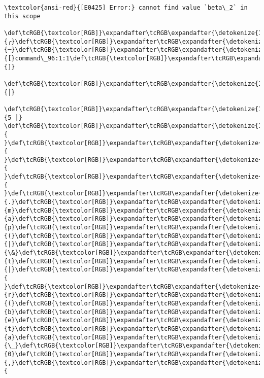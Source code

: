 \documentclass[11pt]{article}
\begin{document}
    \begin{Verbatim}[commandchars=\\\{\}, frame=single, framerule=2mm, rulecolor=\color{outerrorbackground}]
\textcolor{ansi-red}{[E0425] Error:} cannot find value `beta\_2` in this scope
   \def\tcRGB{\textcolor[RGB]}\expandafter\tcRGB\expandafter{\detokenize{148,148,148}}{╭}\def\tcRGB{\textcolor[RGB]}\expandafter\tcRGB\expandafter{\detokenize{148,148,148}}{─}\def\tcRGB{\textcolor[RGB]}\expandafter\tcRGB\expandafter{\detokenize{148,148,148}}{[}command\_96:1:1\def\tcRGB{\textcolor[RGB]}\expandafter\tcRGB\expandafter{\detokenize{148,148,148}}{]}
   \def\tcRGB{\textcolor[RGB]}\expandafter\tcRGB\expandafter{\detokenize{148,148,148}}{│}
 \def\tcRGB{\textcolor[RGB]}\expandafter\tcRGB\expandafter{\detokenize{148,148,148}}{5 │} \def\tcRGB{\textcolor[RGB]}\expandafter\tcRGB\expandafter{\detokenize{178,178,178}}{ }\def\tcRGB{\textcolor[RGB]}\expandafter\tcRGB\expandafter{\detokenize{178,178,178}}{ }\def\tcRGB{\textcolor[RGB]}\expandafter\tcRGB\expandafter{\detokenize{178,178,178}}{ }\def\tcRGB{\textcolor[RGB]}\expandafter\tcRGB\expandafter{\detokenize{178,178,178}}{ }\def\tcRGB{\textcolor[RGB]}\expandafter\tcRGB\expandafter{\detokenize{178,178,178}}{.}\def\tcRGB{\textcolor[RGB]}\expandafter\tcRGB\expandafter{\detokenize{178,178,178}}{m}\def\tcRGB{\textcolor[RGB]}\expandafter\tcRGB\expandafter{\detokenize{178,178,178}}{a}\def\tcRGB{\textcolor[RGB]}\expandafter\tcRGB\expandafter{\detokenize{178,178,178}}{p}\def\tcRGB{\textcolor[RGB]}\expandafter\tcRGB\expandafter{\detokenize{178,178,178}}{(}\def\tcRGB{\textcolor[RGB]}\expandafter\tcRGB\expandafter{\detokenize{178,178,178}}{|}\def\tcRGB{\textcolor[RGB]}\expandafter\tcRGB\expandafter{\detokenize{178,178,178}}{\&}\def\tcRGB{\textcolor[RGB]}\expandafter\tcRGB\expandafter{\detokenize{178,178,178}}{t}\def\tcRGB{\textcolor[RGB]}\expandafter\tcRGB\expandafter{\detokenize{178,178,178}}{|}\def\tcRGB{\textcolor[RGB]}\expandafter\tcRGB\expandafter{\detokenize{178,178,178}}{ }\def\tcRGB{\textcolor[RGB]}\expandafter\tcRGB\expandafter{\detokenize{178,178,178}}{r}\def\tcRGB{\textcolor[RGB]}\expandafter\tcRGB\expandafter{\detokenize{178,178,178}}{(}\def\tcRGB{\textcolor[RGB]}\expandafter\tcRGB\expandafter{\detokenize{178,178,178}}{b}\def\tcRGB{\textcolor[RGB]}\expandafter\tcRGB\expandafter{\detokenize{178,178,178}}{e}\def\tcRGB{\textcolor[RGB]}\expandafter\tcRGB\expandafter{\detokenize{178,178,178}}{t}\def\tcRGB{\textcolor[RGB]}\expandafter\tcRGB\expandafter{\detokenize{178,178,178}}{a}\def\tcRGB{\textcolor[RGB]}\expandafter\tcRGB\expandafter{\detokenize{178,178,178}}{\_}\def\tcRGB{\textcolor[RGB]}\expandafter\tcRGB\expandafter{\detokenize{178,178,178}}{0}\def\tcRGB{\textcolor[RGB]}\expandafter\tcRGB\expandafter{\detokenize{178,178,178}}{,}\def\tcRGB{\textcolor[RGB]}\expandafter\tcRGB\expandafter{\detokenize{178,178,178}}{ 
\end{Verbatim}
\end{document}
